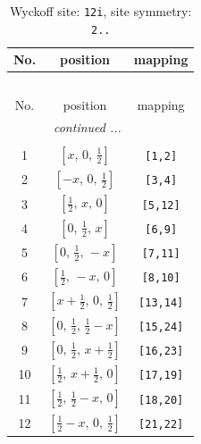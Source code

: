 \documentclass[fleqn,8pt]{jsarticle}
\begin{document}
\begin{longtable}{ccc}
\caption{Wyckoff site: {\tt 12i}, site symmetry: {\tt 2..}}
 \\
 \hline \hline
No. & position & mapping \\ \hline \endfirsthead

\multicolumn{2}{l}{\tablename\ \thetable{}} \\
 \hline \hline
No. & position & mapping \\ \hline \endhead

 \hline \hline
\multicolumn{2}{r}{\footnotesize\it continued ...} \\ \endfoot

 \hline \hline
\multicolumn{2}{r}{} \\ \endlastfoot

1 & $\left[ x,\, 0,\, \frac{1}{2} \right]$ & {\tt [1,2]} \\ \hline
2 & $\left[ - x,\, 0,\, \frac{1}{2} \right]$ & {\tt [3,4]} \\ \hline
3 & $\left[ \frac{1}{2},\, x,\, 0 \right]$ & {\tt [5,12]} \\ \hline
4 & $\left[ 0,\, \frac{1}{2},\, x \right]$ & {\tt [6,9]} \\ \hline
5 & $\left[ 0,\, \frac{1}{2},\, - x \right]$ & {\tt [7,11]} \\ \hline
6 & $\left[ \frac{1}{2},\, - x,\, 0 \right]$ & {\tt [8,10]} \\ \hline
7 & $\left[ x + \frac{1}{2},\, 0,\, \frac{1}{2} \right]$ & {\tt [13,14]} \\ \hline
8 & $\left[ 0,\, \frac{1}{2},\, \frac{1}{2} - x \right]$ & {\tt [15,24]} \\ \hline
9 & $\left[ 0,\, \frac{1}{2},\, x + \frac{1}{2} \right]$ & {\tt [16,23]} \\ \hline
10 & $\left[ \frac{1}{2},\, x + \frac{1}{2},\, 0 \right]$ & {\tt [17,19]} \\ \hline
11 & $\left[ \frac{1}{2},\, \frac{1}{2} - x,\, 0 \right]$ & {\tt [18,20]} \\ \hline
12 & $\left[ \frac{1}{2} - x,\, 0,\, \frac{1}{2} \right]$ & {\tt [21,22]} \\
\end{longtable}
\renewcommand{\arraystretch}{1.2}
\end{document}
